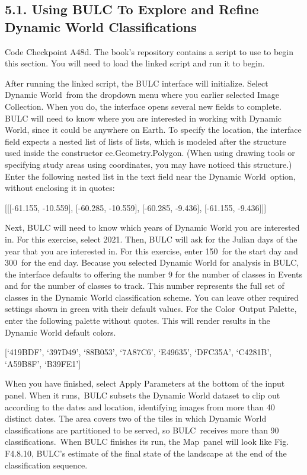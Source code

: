 \documentclass[
  letterpaper,
  DIV=11,
  numbers=noendperiod]{scrreprt}
\begin{document}
\hypertarget{using-bulc-to-explore-and-refine-dynamic-world-classifications}{%
\subsection{5.1. Using BULC To Explore and Refine Dynamic World
Classifications}\label{using-bulc-to-explore-and-refine-dynamic-world-classifications}}

Code Checkpoint A48d. The book's repository contains a script to use to
begin this section. You will need to load the linked script and run it
to begin.

After running the linked script, the BULC interface will initialize.
Select Dynamic World~from the dropdown menu where you earlier selected
Image Collection. When you do, the interface opens several new fields to
complete. BULC will need to know where you are interested in working
with Dynamic World, since it could be anywhere on Earth. To specify the
location, the interface field expects a nested list of lists of lists,
which is modeled after the structure used inside the constructor
ee.Geometry.Polygon. (When using drawing tools or specifying study areas
using coordinates, you may have noticed this structure.) Enter the
following nested list in the text field near the Dynamic World~option,
without enclosing it in quotes:

{[}{[}{[}-61.155, -10.559{]}, {[}-60.285, -10.559{]}, {[}-60.285,
-9.436{]}, {[}-61.155, -9.436{]}{]}{]}

Next, BULC will need to know which years of Dynamic World you are
interested in. For this exercise, select 2021. Then, BULC will ask for
the Julian days of the year that you are interested in. For this
exercise, enter 150~for the start day and 300~for the end day. Because
you selected Dynamic World for analysis in BULC, the interface defaults
to offering the number 9 for the number of classes in Events and for the
number of classes to track. This number represents the full set of
classes in the Dynamic World classification scheme. You can leave other
required settings shown in green with their default values. For the
Color~Output Palette, enter the following palette without quotes. This
will render results in the Dynamic World default colors.

{[}`419BDF', `397D49', `88B053', `7A87C6', `E49635', `DFC35A', `C4281B',
`A59B8F', `B39FE1'{]}

When you have finished, select Apply Parameters at the bottom of the
input panel. When it runs,~BULC subsets the Dynamic World dataset to
clip out according to the dates and location, identifying images from
more than 40 distinct dates. The area covers two of the tiles in which
Dynamic World classifications are partitioned to be served, so
BULC~receives more than 90 classifications.~When BULC finishes its run,
the Map~panel will look like Fig. F4.8.10, BULC's estimate of the final
state of the landscape at the end of the classification sequence.
\end{document}
